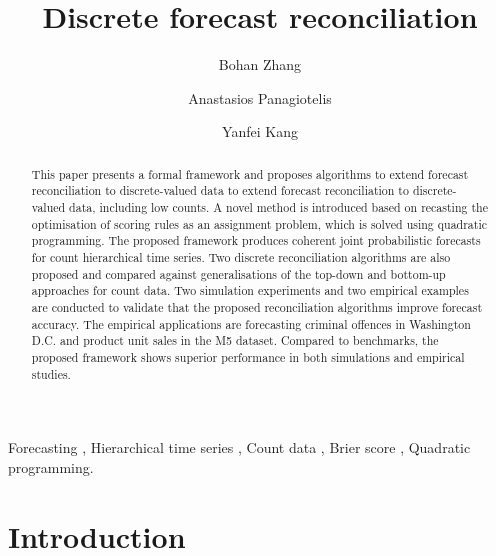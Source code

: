 \documentclass[a4paper,review,12pt,authoryear]{elsarticle}
\theoremstyle{definition}
\begin{document}
\begin{frontmatter}

  \title{Discrete forecast reconciliation}

  \author[label1]{Bohan Zhang}
  \address[label1]{School of Economics and Management, Beihang University, Beijing, China}
  \author[label2]{Anastasios Panagiotelis}

  \author[label1]{Yanfei Kang}
  \address[label2]{The University of Sydney Business School, NSW 2006, Australia}

  \begin{abstract}

    This paper presents a formal framework and proposes algorithms to extend forecast reconciliation to discrete-valued data to extend forecast reconciliation to discrete-valued data, including low counts. A novel method is introduced based on recasting the optimisation of scoring rules as an assignment problem, which is solved using quadratic programming. The proposed framework produces coherent joint probabilistic forecasts for count hierarchical time series.
    Two discrete reconciliation algorithms are also proposed and compared against generalisations of the top-down and bottom-up approaches for count data. Two simulation experiments and two empirical examples are conducted to validate that the proposed reconciliation algorithms improve forecast accuracy. The empirical applications are forecasting criminal offences in Washington D.C. and product unit sales in the M5 dataset. Compared to benchmarks, the proposed framework shows superior performance in both simulations and empirical studies.

  \end{abstract}

  \begin{keyword}
  Forecasting \sep
  Hierarchical time series \sep
  Count data \sep
  Brier score \sep
  Quadratic programming.
  \end{keyword}

\end{frontmatter}

\newpage
\linenumbers

\section{Introduction}
\end{document}
